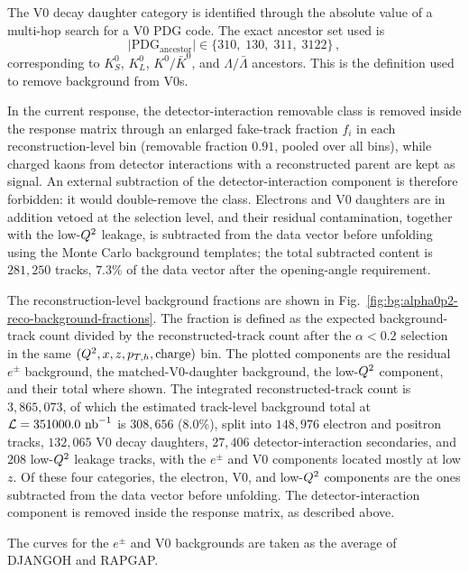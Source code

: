 The V0 decay daughter category is identified through the absolute value of
a multi-hop search for a V0 PDG code.  The exact ancestor set used is
\begin{equation}
  |\mathrm{PDG}_{\mathrm{ancestor}}| \in \{310,\;130,\;311,\;3122\}\, ,
\end{equation}
corresponding to $K^{0}_{S}$, $K^{0}_{L}$, $K^{0}/\bar K^{0}$, and
$\Lambda/\bar\Lambda$ ancestors.  This is the definition used to remove background from V0s.

In the current response, the detector-interaction removable
class is removed inside the response matrix through an enlarged fake-track
fraction $f_i$ in each reconstruction-level bin (removable fraction $0.91$, pooled over all bins), while charged kaons
from detector interactions with a reconstructed parent are kept as signal.  An
external subtraction of the detector-interaction component is therefore
forbidden: it would double-remove the class.  Electrons and V0 daughters are
in addition vetoed at the selection level, and their residual contamination,
together with the low-$Q^{2}$ leakage, is subtracted from the data vector
before unfolding using the Monte Carlo background templates; the total
subtracted content is $281{,}250$ tracks, $7.3\%$ of the data vector
after the opening-angle requirement.

The reconstruction-level background fractions are shown in
Fig.~\ref{fig:bg:alpha0p2-reco-background-fractions}.  The fraction is defined
as the expected background-track count divided by the reconstructed-track
count after the $\alpha<0.2$ selection in the same
$(Q^{2},x,z,p_{T,h},\mathrm{charge})$ bin. The plotted
components are the residual $e^\pm$ background, the matched-V0-daughter
background, the low-$Q^{2}$ component, and their total where shown. The integrated reconstructed-track count is $3{,}865{,}073$, of which the estimated track-level background total at $\mathcal{L}=351000.0~\text{nb}^{-1}$ is $308{,}656$ ($8.0\%$), split into $148{,}976$ electron and positron tracks, $132{,}065$ V0 decay daughters, $27{,}406$ detector-interaction secondaries, and $208$ low-$Q^{2}$ leakage tracks, with the $e^\pm$ and V0 components located mostly at low $z$.
Of these four categories, the electron, V0, and low-$Q^{2}$ components are the
ones subtracted from the data vector before unfolding.  The
detector-interaction component is removed inside the response matrix, as
described above.

The curves for the $e^\pm$ and V0 backgrounds are taken as the average of DJANGOH and RAPGAP.

